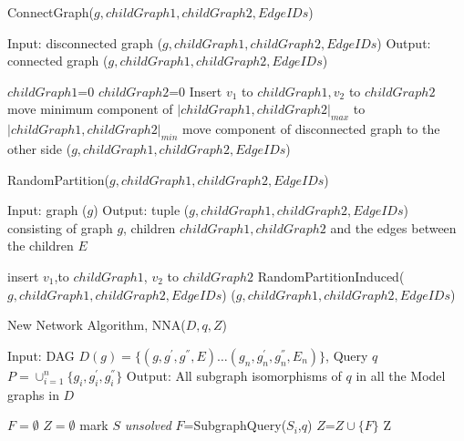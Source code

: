 \begin{algorithm}
\caption{ConnectGraph($g,childGraph1,childGraph2,EdgeIDs$)}
\label{alg:alg103}
\begin{algorithmic}
\STATE Input: disconnected graph ($g,childGraph1,childGraph2,EdgeIDs$)
\STATE Output: connected graph ($g,childGraph1,childGraph2,EdgeIDs$)
\end{algorithmic}
\begin{algorithmic}[1]
\STATE $childGraph1$=0
\STATE $childGraph2$=0
   \STATE Insert $v_{1}$ to $childGraph1, v_{2}$ to $childGraph2$
\ELSE 
    \STATE move minimum component of $|childGraph1 ,childGraph2 |_{max} $ to $|childGraph1 ,childGraph2 |_{min} $
  \ELSE
    \STATE move component of disconnected graph to the other side
  \ENDIF
 \ENDWHILE
\ENDIF
\RETURN ($g,childGraph1,childGraph2,EdgeIDs$)
\end{algorithmic}
\end{algorithm}


\begin{algorithm}
\caption{RandomPartition($g,childGraph1,childGraph2,EdgeIDs$)}
\label{alg:alg104}
\begin{algorithmic}
\STATE Input: graph ($g$)
\STATE Output: tuple ($g,childGraph1,childGraph2,EdgeIDs$) consisting of graph $g$, children  $childGraph1,childGraph2 $ and the edges between the children $E$ 
\end{algorithmic}
\begin{algorithmic}[1]
    \STATE insert $v_1$,to $childGraph1$, $v_2$ to $childGraph2$    
 \ELSE
   \STATE RandomPartitionInduced($g,childGraph1,childGraph2,EdgeIDs$)
\ENDIF
\RETURN ($g,childGraph1,childGraph2,EdgeIDs$)
\end{algorithmic}
\end{algorithm}


\begin{algorithm}
\caption{New Network Algorithm, NNA($D , q , Z$)}
\label{alg:alg105}
\begin{algorithmic}
\STATE Input: DAG $D(g)=\{(g,g^{'},g^{''} ,E)\dots (g_n ,g_n^{'},g_{n}^{''} ,E_n )\}$, Query $q$
\STATE $P = \cup_{i=1}^n \{g_i ,g_i^{'},g_i^{''} \}$ 
\STATE Output: All subgraph isomorphisms of $q$ in all the Model graphs in $D$
\end{algorithmic}
\begin{algorithmic}[1]
\STATE $F=\emptyset$
\STATE $Z=\emptyset$
  \STATE mark $S$ \textit{unsolved}
\ENDFOR
{}
   \STATE $F$=SubgraphQuery($S_i$,$q$)
      \STATE $Z$=$Z \cup \{F\}$
   \ENDIF
\ENDFOR
\RETURN Z
\end{algorithmic}
\end{algorithm}


